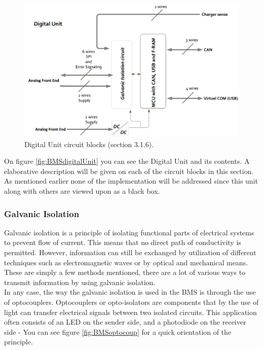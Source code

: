 \begin{figure}[H]
	\centering
	\includegraphics[width=1.0\linewidth]{Hardware/Pictures/BMSdigitalUnit}
	\caption[Empty]{Digital Unit circuit blocks \cite{BMSDocumentation} (section 3.1.6).}
	\label{fig:BMSdigitalUnit}
\end{figure}

On figure \vref{fig:BMSdigitalUnit} you can see the Digital Unit and its contents. A elaborative description will be given on each of the circuit blocks in this section. As mentioned earlier none of the implementation will be addressed since this unit along with others are viewed upon as a black box.

\subsubsection{Galvanic Isolation}
Galvanic isolation is a principle of isolating functional parts of electrical systems to prevent flow of current. This means that no direct path of conductivity is permitted. However, information can still be exchanged by utilization of different techniques such as electromagnetic waves or by optical and mechanical means. These are simply a few methods mentioned, there are a lot of various ways to transmit information by using galvanic isolation.\\
In any case, the way the galvanic isolation is used in the BMS is through the use of optocouplers. Optocouplers or opto-isolators are components that by the use of light can transfer electrical signals between two isolated circuits. This application often consists of an LED on the sender side, and a photodiode on the receiver side - You can see figure \vref{fig:BMSoptocoup} for a quick orientation of the principle.


